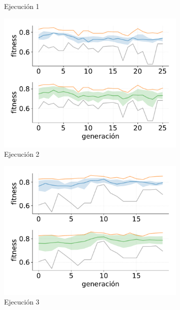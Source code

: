 \begin{figure}
\begin{subfigure}{0.47\textwidth}
        \caption{Ejecución 1}
    \end{subfigure}
    \hfill
    \begin{subfigure}{0.47\textwidth}
        \centering
        \includegraphics[width=\textwidth]{figuras/experimentos/exp_no_elitismo/no_elitismo_2.pdf}
        \caption{Ejecución 2}
    \end{subfigure}
    \hfill
    \begin{subfigure}{0.47\textwidth}
        \centering
        \includegraphics[width=\textwidth]{figuras/experimentos/exp_no_elitismo/no_elitismo_3.pdf}
        \caption{Ejecución 3}
    \end{subfigure}
    \hfill
    \begin{subfigure}{0.47\textwidth}

\end{subfigure}
\end{figure}
